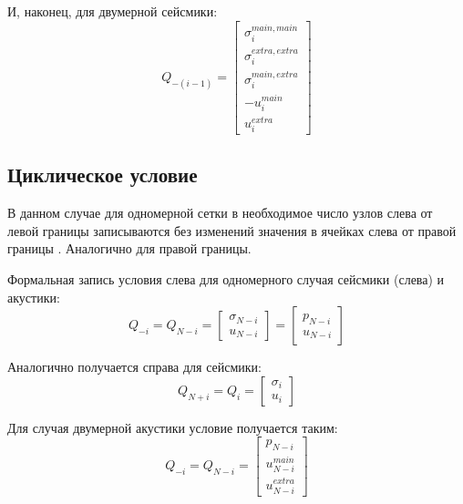 \documentclass{article}
\begin{document}
\indent
И, наконец, для двумерной сейсмики:
$$Q_{-(i-1)} =  \left[ \begin{array}{c}
                      \sigma^{main, main}_{i} \\
                      \sigma^{extra, extra}_{i} \\
                      \sigma^{main, extra}_{i} \\
                      -u^{main}_{i} \\
                      u^{extra}_{i}
                      \end{array}    \right] $$

\subsection{Циклическое условие}

\indent
В данном случае для одномерной сетки в необходимое число узлов слева от левой границы записываются без изменений значения в ячейках слева от правой границы \cite[глава 7.1]{finite}. Аналогично для правой границы.

\indent
Формальная запись условия слева для одномерного случая сейсмики (слева) и акустики:
$$Q_{-i} = Q_{N-i} = \left[ \begin{array}{c}
                            \sigma_{N-i} \\
                            u_{N-i}
                            \end{array}    \right] =
                     \left[ \begin{array}{c}
                            p_{N-i} \\
                            u_{N-i}
                            \end{array}    \right] $$

\indent
Аналогично получается справа для сейсмики:
$$Q_{N+i} = Q_{i} = \left[ \begin{array}{c}
                           \sigma_{i} \\
                           u_{i}
                           \end{array}    \right] $$

\indent
Для случая двумерной акустики условие получается таким:
$$Q_{-i} = Q_{N-i} = \left[ \begin{array}{c}
                            p_{N-i} \\
                            u^{main}_{N-i} \\
                            u^{extra}_{N-i} 
                            \end{array}    \right] $$
\end{document}
